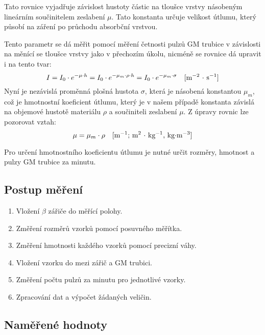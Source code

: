 \documentclass[fleqn]{protokol}
\begin{document}
        Tato rovnice vyjadřuje závislost hustoty částic na tloušce vrstvy násobeným lineárním součinitelem zeslabení $\mu$. Tato konstanta určuje velikost útlumu, který působí na záření po průchodu absorbční vrstvou.

        Tento parametr se dá měřit pomocí měření četnosti pulzů GM trubice v závislosti na měnící se tloušce vrstvy jako v přechozím úkolu, nicméně se rovnice dá upravit \\i na tento tvar:
        \begin{equation}
            I = I_0 \cdot e^{-\mu \cdot h} = I_0 \cdot e^{-\mu_m \cdot \rho \cdot h} = I_0 \cdot e^{-\mu_m \cdot \sigma} \text{\quad[m$^{-2}$ $\cdot$ s$^{-1}$]}
        \end{equation} 
        Nyní je nezávislá proměnná plošná hustota $\sigma$, která je násobená konstantou $\mu_m$, což je hmotnostní koeficient útlumu, který je v našem případě konstanta závislá na objemové hustotě materiálu $\rho$ a součiniteli zeslabení $\mu$. Z úpravy rovnic lze pozorovat vztah:
        \begin{equation}
           \mu = \mu_m \cdot \rho \text{\quad[m$^{-1}$; m$^{2}$ $\cdot$ kg$^{-1}$, kg$\cdot$m$^{-3}$]}
        \end{equation} 

        Pro určení hmotnostního koeficientu útlumu je nutné určit rozměry, hmotnost a pulzy GM trubice za minutu.
    \pagebreak
    \subsection{Postup měření}
        \begin{enumerate}
            \item Vložení $\beta$ zářiče do měřící polohy.
            \item Změření rozměrů vzorků pomocí posuvného měřítka.
            \item Změření hmotnosti každého vzorků pomocí precizní váhy.
            \item Vložení vzorku do mezi zářič a GM trubici.
            \item Změření počtu pulzů za minutu pro jednotlivé vzorky.
            \item Zpracování dat a výpočet žádaných veličin. 
        \end{enumerate}

    \subsection{Naměřené hodnoty}  
        
\end{document}

